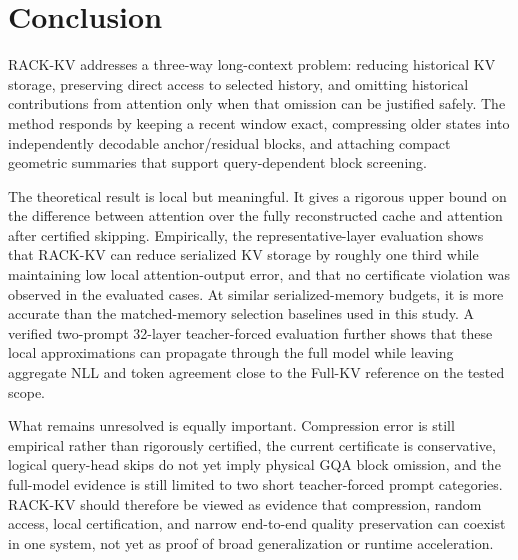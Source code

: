 \section{Conclusion}

RACK-KV addresses a three-way long-context problem: reducing historical KV storage, preserving direct access to selected history, and omitting historical contributions from attention only when that omission can be justified safely. The method responds by keeping a recent window exact, compressing older states into independently decodable anchor/residual blocks, and attaching compact geometric summaries that support query-dependent block screening.

The theoretical result is local but meaningful. It gives a rigorous upper bound on the difference between attention over the fully reconstructed cache and attention after certified skipping. Empirically, the representative-layer evaluation shows that RACK-KV can reduce serialized KV storage by roughly one third while maintaining low local attention-output error, and that no certificate violation was observed in the evaluated cases. At similar serialized-memory budgets, it is more accurate than the matched-memory selection baselines used in this study. A verified two-prompt 32-layer teacher-forced evaluation further shows that these local approximations can propagate through the full model while leaving aggregate NLL and token agreement close to the Full-KV reference on the tested scope.

What remains unresolved is equally important. Compression error is still empirical rather than rigorously certified, the current certificate is conservative, logical query-head skips do not yet imply physical GQA block omission, and the full-model evidence is still limited to two short teacher-forced prompt categories. RACK-KV should therefore be viewed as evidence that compression, random access, local certification, and narrow end-to-end quality preservation can coexist in one system, not yet as proof of broad generalization or runtime acceleration.

